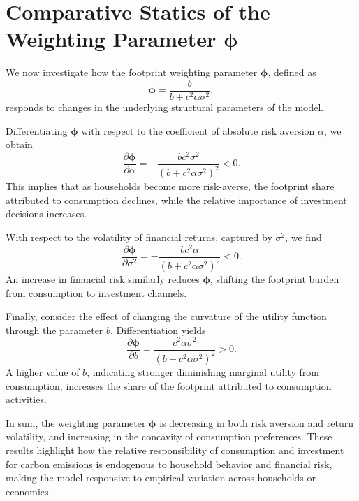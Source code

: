 \documentclass[12pt,a4paper]{article}
\begin{document}
\section{Comparative Statics of the Weighting Parameter \( \boldsymbol{\phi} \)}

We now investigate how the footprint weighting parameter \( \boldsymbol{\phi} \), defined as
\[
\boldsymbol{\phi} = \frac{b}{b + c^2 \alpha \sigma^2},
\]
responds to changes in the underlying structural parameters of the model.

Differentiating \( \boldsymbol{\phi} \) with respect to the coefficient of absolute risk aversion \( \alpha \), we obtain
\[
\frac{\partial \boldsymbol{\phi}}{\partial \alpha} = -\frac{b c^2 \sigma^2}{(b + c^2 \alpha \sigma^2)^2} < 0.
\]
This implies that as households become more risk-averse, the footprint share attributed to consumption declines, while the relative importance of investment decisions increases.

With respect to the volatility of financial returns, captured by \( \sigma^2 \), we find
\[
\frac{\partial \boldsymbol{\phi}}{\partial \sigma^2} = -\frac{b c^2 \alpha}{(b + c^2 \alpha \sigma^2)^2} < 0.
\]
An increase in financial risk similarly reduces \( \boldsymbol{\phi} \), shifting the footprint burden from consumption to investment channels.

Finally, consider the effect of changing the curvature of the utility function through the parameter \( b \). Differentiation yields
\[
\frac{\partial \boldsymbol{\phi}}{\partial b} = \frac{c^2 \alpha \sigma^2}{(b + c^2 \alpha \sigma^2)^2} > 0.
\]
A higher value of \( b \), indicating stronger diminishing marginal utility from consumption, increases the share of the footprint attributed to consumption activities.

In sum, the weighting parameter \( \boldsymbol{\phi} \) is decreasing in both risk aversion and return volatility, and increasing in the concavity of consumption preferences. These results highlight how the relative responsibility of consumption and investment for carbon emissions is endogenous to household behavior and financial risk, making the model responsive to empirical variation across households or economies.
\end{document}
